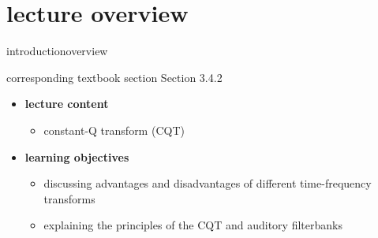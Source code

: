 


\subtitle{Module 3.4.2: Time-Frequency Representations~---~Constant Q Transform}


	

    \section[overview]{lecture overview}
        \begin{frame}{introduction}{overview}
            \begin{block}{corresponding textbook section}
                    Section 3.4.2
            \end{block}

            \begin{itemize}
                \item   \textbf{lecture content}
                    \begin{itemize}
                        \item   constant-Q transform (CQT)
                    \end{itemize}
                \bigskip
                \item<2->   \textbf{learning objectives}
                    \begin{itemize}
                        \item   discussing advantages and disadvantages of different time-frequency transforms
                        \item   explaining the principles of the CQT and auditory filterbanks
                    \end{itemize}
            \end{itemize}
        \end{frame}
        
